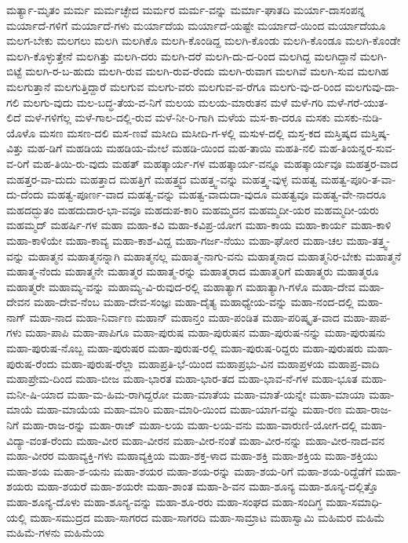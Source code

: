 ಮರ್ತ್ಯಾ-ಮೃತಂ
ಮರ್ಮ
ಮರ್ಮಚ್ಛೇದ
ಮರ್ಮರ
ಮರ್ಮ-ವನ್ನು
ಮರ್ಮಾ-ಘಾತದಿ
ಮರ್ಯಾ-ದಾಸಂಪನ್ನ
ಮರ್ಯಾದೆ-ಗಳಿಗೆ
ಮರ್ಯಾದೆ-ಗಳು
ಮರ್ಯಾದೆಯ
ಮರ್ಯಾದೆ-ಯಷ್ಟೇ
ಮರ್ಯಾದೆ-ಯಿಂದ
ಮರ್ಯಾದೆಯೂ
ಮಲಗ-ಬೇಕು
ಮಲಗಲು
ಮಲಗಿ
ಮಲಗಿಕೊ
ಮಲಗಿ-ಕೊಂಡಿದ್ದ
ಮಲಗಿ-ಕೊಂಡು
ಮಲಗಿ-ಕೊಂಡೂ
ಮಲಗಿ-ಕೊಂಡೇ
ಮಲಗಿ-ಕೊಳ್ಳುತ್ತೇನೆ
ಮಲಗಿತ್ತು
ಮಲಗಿ-ದರು
ಮಲಗಿ-ದರೆ
ಮಲಗಿ-ದು-ದ-ರಿಂದ
ಮಲಗಿದ್ದ
ಮಲಗಿದ್ದಾನೆ
ಮಲಗಿ-ಬಿಟ್ಟೆ
ಮಲಗಿ-ರ-ಬ-ಹುದು
ಮಲಗಿ-ರುವ
ಮಲಗಿ-ರುವ-ರೆಂದು
ಮಲಗಿ-ರುವಾಗ
ಮಲಗಿವೆ
ಮಲಗಿ-ಸುವ
ಮಲಗಿಹ
ಮಲಗುತ್ತಾನೆ
ಮಲಗುತ್ತಿದ್ದಾರೆ
ಮಲಗುವ
ಮಲಗು-ವರು
ಮಲಗುವ-ವ-ರೆಗೂ
ಮಲಗು-ವು-ದ-ರಿಂದ
ಮಲಗುವು-ದಾ-ಗಲಿ
ಮಲಗು-ವುದು
ಮಲ-ಬದ್ಧ-ತೆಯ-ವ-ನಿಗೆ
ಮಲಯ
ಮಲಯ-ಮಾರುತನ
ಮಳೆ
ಮಳೆ-ಗರಿ
ಮಳೆ-ಗರೆ-ಯುತ-ಲಿದೆ
ಮಳೆ-ಗಳಿಗೆಲ್ಲ
ಮಳೆ-ಗಾಲ-ದಲ್ಲಿ-ರುವ
ಮಳೆ-ನೀ-ರಿ-ಗಾಗಿ
ಮಳೆಯ
ಮಸ-ಕಾ-ದರೂ
ಮಸಕು
ಮಸಕು-ನುಡಿ-ಯೊಳೊ
ಮಸಣ
ಮಸಣ-ದಲಿ
ಮಸ-ಣವೆ
ಮಸೀದಿ
ಮಸೀದಿ-ಗ-ಳಲ್ಲಿ
ಮಸುಳ-ದಲ್ಲಿ
ಮಸ್ತ-ಕದ
ಮಸ್ತಿಷ್ಕದ
ಮಸ್ತಿಷ್ಕ-ವಿತ್ತು
ಮಹ-ಡಿಗೆ
ಮಹಡಿಯ
ಮಹಡಿಯ-ಮೇಲೆ
ಮಹಡಿ-ಯಿಂದ
ಮಹ-ತಾಯಿ
ಮಹತಿ-ನಲಿ
ಮಹ-ತಿಯನ್ನರ-ಸುವ-ವ-ರಿಗೆ
ಮಹ-ತಿಯಿ-ರು-ವುದು
ಮಹತ್
ಮಹತ್ಕಾರ್ಯ-ಗಳ
ಮಹತ್ಕಾರ್ಯ-ವನ್ನೂ
ಮಹತ್ಕಾರ್ಯವೂ
ಮಹತ್ತರ-ವಾದ
ಮಹತ್ತರ-ವಾ-ದುದು
ಮಹತ್ತಾದ
ಮಹತ್ತಿಗೆ
ಮಹತ್ತ್ವದ
ಮಹತ್ತ್ವ-ವನ್ನು
ಮಹತ್ತ್ವ-ವುಳ್ಳ
ಮಹತ್ವ
ಮಹತ್ವ-ಪೂರಿ-ತ-ವಾ-ದು-ದೆಂದು
ಮಹತ್ವ-ಪೂರ್ಣ-ವಾದ
ಮಹತ್ವ-ವನ್ನು
ಮಹತ್ವ-ವಾದುದಾ-ವುದೂ
ಮಹತ್ವವೂ
ಮಹತ್ವ-ವೇ-ನಾದರೂ
ಮಹದದ್ಭುತಂ
ಮಹದುದಾರ-ಭಾ-ವವೂ
ಮಹದುಪ-ಕಾರಿ
ಮಹಮ್ಮದನ
ಮಹಮ್ಮದೀ-ಯರ
ಮಹಮ್ಮದೀ-ಯರು
ಮಹಮ್ಮದ್
ಮಹರ್ಷಿ-ಗಳ
ಮಹಾ
ಮಹಾ-ಕವಿ
ಮಹಾ-ಕವಿಪ್ರ-ಯೋಗ
ಮಹಾ-ಕಾಯ
ಮಹಾ-ಕಾರ್ಯ
ಮಹಾ-ಕಾಳಿ
ಮಹಾ-ಕಾಳಿಯೇ
ಮಹಾ-ಕಾವ್ಯ
ಮಹಾ-ಕಾಶ-ವಿದ್ದ
ಮಹಾ-ಗರ್ಜ-ನೆಯು
ಮಹಾ-ಘೋರ
ಮಹಾ-ಚಲ
ಮಹಾ-ತತ್ತ್ವ-ವನ್ನು
ಮಹಾತ್ಮನ
ಮಹಾತ್ಮನನ್ನಾಗಿ
ಮಹಾತ್ಮನಲ್ಲ
ಮಹಾತ್ಮ-ನಾಗು-ವನು
ಮಹಾತ್ಮನಾದ
ಮಹಾತ್ಮನಿರ-ಬೇಕು
ಮಹಾತ್ಮನೆ
ಮಹಾತ್ಮ-ನೆಂದು
ಮಹಾತ್ಮನೇ
ಮಹಾತ್ಮರ
ಮಹಾತ್ಮ-ರನ್ನು
ಮಹಾತ್ಮರಾದ
ಮಹಾತ್ಮರಿಗೆ
ಮಹಾತ್ಮರು
ಮಹಾತ್ಮರೂ
ಮಹಾತ್ಮರೇ
ಮಹಾಮ್ಯ-ವನ್ನು
ಮಹಾಮ್ಯ-ವಿ-ರುವುದ-ರಲ್ಲಿ
ಮಹಾತ್ಯಾಗ
ಮಹಾತ್ಯಾಗಿ-ಗಳೊ
ಮಹಾ-ದೇವ
ಮಹಾ-ದೇವನ
ಮಹಾ-ದೇವ-ನೆಂಬ
ಮಹಾ-ದೇವ-ಸಂಜ್ಞಃ
ಮಹಾ-ದೈತ್ಯ
ಮಹಾಧ್ಯೇಯ-ವನ್ನು
ಮಹಾ-ನಂದ-ದಲ್ಲಿ
ಮಹಾ-ನಾಗ್
ಮಹಾ-ನಾದ
ಮಹಾ-ನಿರ್ವಾಣ
ಮಹಾನ್
ಮಹಾನ್ತಂ
ಮಹಾ-ಪಂಡಿತ
ಮಹಾ-ಪರಿಷ್ಕೃತ-ವಾದ
ಮಹಾ-ಪಾಪ-ಗಳು
ಮಹಾ-ಪಾಪಿ
ಮಹಾ-ಪಾಪಿಗೂ
ಮಹಾ-ಪುರುಷ
ಮಹಾ-ಪುರುಷನ
ಮಹಾ-ಪುರುಷ-ನನ್ನು
ಮಹಾ-ಪುರುಷನು
ಮಹಾ-ಪುರುಷ-ನೊಬ್ಬ
ಮಹಾ-ಪುರುಷರ
ಮಹಾ-ಪುರುಷ-ರಲ್ಲಿ
ಮಹಾ-ಪುರುಷ-ರಿದ್ದರು
ಮಹಾ-ಪುರುಷರು
ಮಹಾ-ಪುರುಷ-ರೆಂದು
ಮಹಾ-ಪುರುಷ-ರೆಲ್ಲಾ
ಮಹಾಪ್ರತಿ-ಭೆ-ಯಿಂದ
ಮಹಾಪ್ರಭು-ವಿನ
ಮಹಾಪ್ರಳಯ
ಮಹಾಪ್ರ-ವಾದಿ
ಮಹಾಪ್ರೇಮ-ದಿಂದ
ಮಹಾ-ಬೀಜ
ಮಹಾ-ಭಾರತ
ಮಹಾ-ಭಾರ-ತದ
ಮಹಾ-ಭಾವ-ನೆ-ಗಳ
ಮಹಾ-ಭೂತ
ಮಹಾ-ಮನೀ-ಷಿ-ಯಾದ
ಮಹಾ-ಮ-ಹಿಮ-ರಾಗಿದ್ದರೋ
ಮಹಾ-ಮಾತೆಯ
ಮಹಾ-ಮಾತೆ-ಯನ್ನೇ
ಮಹಾ-ಮಾಯಾ
ಮಹಾ-ಮಾಯೆ
ಮಹಾ-ಮಾಯೆಯ
ಮಹಾ-ಮಾರಿ
ಮಹಾ-ಮಾರಿ-ಯಿಂದ
ಮಹಾ-ಯಾಗ-ವನ್ನು
ಮಹಾ-ರಣ
ಮಹಾ-ರಾಜ-ನಿಗೆ
ಮಹಾ-ರಾಜ-ರನ್ನು
ಮಹಾ-ರಾಜ್
ಮಹಾ-ಲಯ
ಮಹಾ-ಲಯ-ವನು
ಮಹಾ-ವಾರುಣಿ-ಯೋಗ-ದಲ್ಲಿ
ಮಹಾ-ವಿದ್ಯಾ-ವಂತ-ರೆಂದು
ಮಹಾ-ವೀರ
ಮಹಾ-ವೀರನ
ಮಹಾ-ವೀರ-ನಂತೆ
ಮಹಾ-ವೀರ-ನನ್ನು
ಮಹಾ-ವೀರ-ನಾದ-ವನ
ಮಹಾ-ವೀರರ
ಮಹಾವ್ಯಕ್ತಿ-ಗಳು
ಮಹಾವ್ಯಕ್ತಿಯ
ಮಹಾ-ಶಕ್ತ-ಳಾದ
ಮಹಾ-ಶಕ್ತಿ
ಮಹಾ-ಶಕ್ತಿಯ
ಮಹಾ-ಶಕ್ತಿಯು
ಮಹಾ-ಶಯ
ಮಹಾ-ಶ-ಯನು
ಮಹಾ-ಶಯರ
ಮಹಾ-ಶಯ-ರನ್ನು
ಮಹಾ-ಶಯ-ರಿಗೆ
ಮಹಾ-ಶಯ-ರಿದ್ದೆಡೆಗೆ
ಮಹಾ-ಶಯರು
ಮಹಾ-ಶಯರೆ
ಮಹಾ-ಶಯರೇ
ಮಹಾ-ಶಾಂತ
ಮಹಾ-ಶಿ-ವನ
ಮಹಾ-ಶೂನ್ಯ
ಮಹಾ-ಶೂನ್ಯ-ದಲ್ಲಿತ್ತೊ
ಮಹಾ-ಶೂನ್ಯ-ದೊಳು
ಮಹಾ-ಶೂನ್ಯ-ವನ್ನು
ಮಹಾ-ಶೂ-ರರು
ಮಹಾ-ಸಂಘದ
ಮಹಾ-ಸಂದಿಗ್ಧ
ಮಹಾ-ಸಮಾಧಿ-ಯಲ್ಲಿ
ಮಹಾ-ಸಮುದ್ರದ
ಮಹಾ-ಸಾಗರದ
ಮಹಾ-ಸಾಗರದಿ
ಮಹಾ-ಸಾಮ್ರಾಟ
ಮಹಾಸ್ವಾಮಿ
ಮಹಿಮರ
ಮಹಿಮೆ
ಮಹಿಮೆ-ಗಳನು
ಮಹಿಮೆಯ
